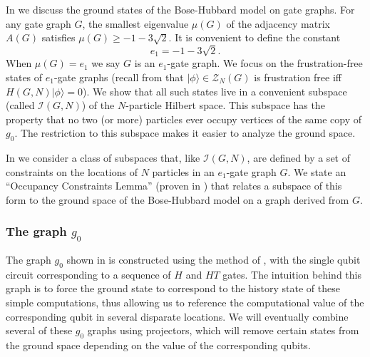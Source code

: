 \documentclass[../thesis-main/thesis-main]{subfiles}
\begin{document}
In  we discuss the ground states of the Bose-Hubbard model on gate graphs. For any gate graph $G$, the smallest eigenvalue $\mu(G)$ of the adjacency matrix $A(G)$ satisfies $\mu(G)\geq-1-3\sqrt{2}$. It is convenient to define the constant
\begin{equation}
e_{1}=-1-3\sqrt{2}.\label{eq:e1_defn}
\end{equation}
When $\mu(G)=e_{1}$ we say $G$ is an $e_{1}$-gate graph. We focus on the frustration-free states of $e_1$-gate graphs (recall from  that $|\phi\rangle\in \mathcal{Z}_N(G)$ is frustration free iff $H(G,N)|\phi\rangle=0$). We show that all such states live in a convenient subspace (called $\mathcal{I}(G,N)$) of the $N$-particle Hilbert space. This subspace has the property that no two (or more) particles ever occupy vertices of the same copy of $g_{0}$. The restriction to this subspace makes it easier to analyze the ground space.

In  we consider a class of subspaces that, like $\mathcal{I}(G,N)$, are defined by a set of constraints on the locations of $N$ particles in an $e_{1}$-gate graph $G$. We state an ``Occupancy Constraints Lemma'' (proven in ) that relates a subspace of this form to the ground space of the Bose-Hubbard model on a graph derived from $G$.


\subsubsection{The graph $g_0$}\label{sec:g_0_graph}

The graph $g_{0}$ shown in  is constructed using the method of , with the single qubit circuit corresponding to a sequence of $H$ and $HT$ gates.  The intuition behind this graph is to force the ground state to correspond to the history state of these simple computations, thus allowing us to reference the computational value of the corresponding qubit in several disparate locations.  We will eventually combine several of these $g_0$ graphs using projectors, which will remove certain states from the ground space depending on the value of the corresponding qubits.
\end{document}
